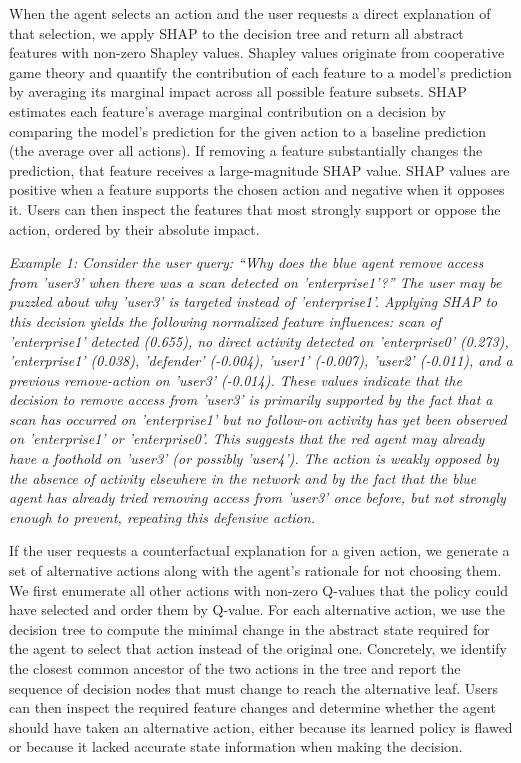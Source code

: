 When the agent selects an action and the user requests a direct explanation of that selection, we apply SHAP \cite{b3} to the decision tree and return all abstract features with non-zero Shapley values. Shapley values originate from cooperative game theory and quantify the contribution of each feature to a model’s prediction by averaging its marginal impact across all possible feature subsets.
SHAP estimates each feature’s average marginal contribution on a decision by comparing the model’s prediction for the given action to a baseline prediction (the average over all actions). 
If removing a feature substantially changes the prediction, that feature receives a large-magnitude SHAP value. 
SHAP values are positive when a feature supports the chosen action and negative when it opposes it. 
Users can then inspect the features that most strongly support or oppose the action, ordered by their absolute impact.

\textit{Example 1: Consider the user query: “Why does the blue agent remove access from 'user3' when there was a scan detected on 'enterprise1'?” 
The user may be puzzled about why 'user3' is targeted instead of 'enterprise1'.
Applying SHAP to this decision yields the following normalized feature influences: scan of 'enterprise1' detected (0.655), no direct activity detected on 'enterprise0' (0.273), 'enterprise1' (0.038), 'defender' (-0.004), 'user1' (-0.007), 'user2' (-0.011), and a previous remove-action on 'user3' (-0.014).
These values indicate that the decision to remove access from 'user3' is primarily supported by the fact that a scan has occurred on 'enterprise1' but no follow-on activity has yet been observed on 'enterprise1' or 'enterprise0'. 
This suggests that the red agent may already have a foothold on 'user3' (or possibly 'user4').
The action is weakly opposed by the absence of activity elsewhere in the network and by the fact that the blue agent has already tried removing access from 'user3' once before, but not strongly enough to prevent, repeating this defensive action.}

If the user requests a counterfactual explanation \cite{b4} for a given action, we generate a set of alternative actions along with the agent’s rationale for not choosing them. 
We first enumerate all other actions with non-zero Q-values that the policy could have selected and order them by Q-value. 
For each alternative action, we use the decision tree to compute the minimal change in the abstract state required for the agent to select that action instead of the original one. 
Concretely, we identify the closest common ancestor of the two actions in the tree and report the sequence of decision nodes that must change to reach the alternative leaf. 
Users can then inspect the required feature changes and determine whether the agent should have taken an alternative action, either because its learned policy is flawed or because it lacked accurate state information when making the decision.

